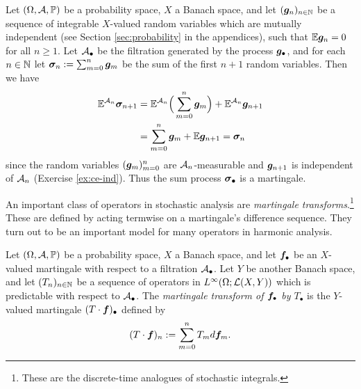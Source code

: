 \begin{example}\label{eg:sum-process}
  Let $(\Omega, \mathcal{A}, \mathbb{P})$ be a probability space, $X$ a Banach space, and let $(\bm{g}_n)_{n \in \mathbb{N}}$ be a sequence of integrable $X$-valued random variables which are mutually independent (see Section \ref{sec:probability} in the appendices), such that $\mathbb{E}\bm{g}_{n} = 0$ for all $n \geq 1$.
  Let $\mathcal{A}_{\bullet}$ be the filtration generated by the process $\bm{g}_{\bullet}$, and for each $n \in \mathbb{N}$ let $\bm{\sigma}_n := \sum_{m=0}^n \bm{g}_m$ be the sum of the first $n+1$ random variables.
  Then we have
  \begin{equation*}
    \begin{aligned}
      \mathbb{E}^{\mathcal{A}_n} \bm{\sigma}_{n+1} &= \mathbb{E}^{\mathcal{A}_n}\Big( \sum_{m=0}^n\bm{g}_m \Big) + \mathbb{E}^{\mathcal{A}_n} \bm{g}_{n+1} \\
      &=\sum_{m=0}^n \bm{g}_m + \mathbb{E}\bm{g}_{n+1} = \bm{\sigma}_n
    \end{aligned}
  \end{equation*}
  since the random variables $(\bm{g}_m)_{m=0}^n$ are $\mathcal{A}_n$-measurable and $\bm{g}_{n+1}$ is independent of $\mathcal{A}_n$ (Exercise \ref{ex:ce-ind}).
  Thus the sum process $\bm{\sigma}_{\bullet}$ is a martingale.
\end{example}

An important class of operators in stochastic analysis are \emph{martingale transforms}.\footnote{These are the discrete-time analogues of stochastic integrals.}
These are defined by acting termwise on a martingale's difference sequence.
They turn out to be an important model for many operators in harmonic analysis.

\begin{defn}
  Let $(\Omega, \mathcal{A}, \mathbb{P})$ be a probability space, $X$ a Banach space, and let $\bm{f}_{\bullet}$ be an $X$-valued martingale with respect to a filtration $\mathcal{A}_{\bullet}$.
  Let $Y$ be another Banach space, and let $(T_n)_{n \in \mathbb{N}}$ be a sequence of operators in $L^\infty(\Omega; \mathcal{L}(X,Y))$ which is predictable with respect to $\mathcal{A}_{\bullet}$.
  The \emph{martingale transform of $\bm{f}_{\bullet}$ by $T_{\bullet}$} is the $Y$-valued martingale $(T \cdot \bm{f})_{\bullet}$ defined by
  \begin{equation*}
    (T \cdot \bm{f})_n := \sum_{m=0}^n T_m d\bm{f}_m.
  \end{equation*}
\end{defn}

